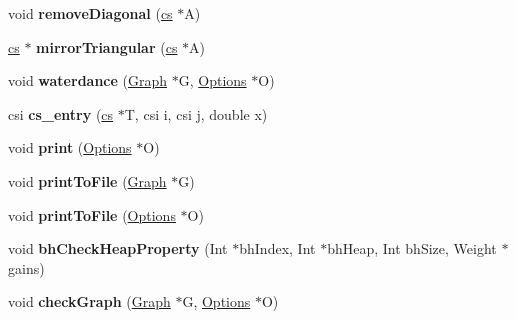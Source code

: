 \begin{DoxyCompactItemize}
\item 
\hypertarget{namespace_mongoose_aebb04732bf01ac108e1ca9cb71ffb901}{}\label{namespace_mongoose_aebb04732bf01ac108e1ca9cb71ffb901} 
void {\bfseries remove\+Diagonal} (\hyperlink{struct_mongoose_1_1cs__sparse}{cs} $\ast$A)
\item 
\hypertarget{namespace_mongoose_aacd398c03bd19cc028404da54e7b865a}{}\label{namespace_mongoose_aacd398c03bd19cc028404da54e7b865a} 
\hyperlink{struct_mongoose_1_1cs__sparse}{cs} $\ast$ {\bfseries mirror\+Triangular} (\hyperlink{struct_mongoose_1_1cs__sparse}{cs} $\ast$A)
\item 
\hypertarget{namespace_mongoose_a73887a05e38bb29fcc0f509ac026bad5}{}\label{namespace_mongoose_a73887a05e38bb29fcc0f509ac026bad5} 
void {\bfseries waterdance} (\hyperlink{class_mongoose_1_1_graph}{Graph} $\ast$G, \hyperlink{struct_mongoose_1_1_options}{Options} $\ast$O)
\item 
\hypertarget{namespace_mongoose_a08c783801d3076b6cfb4527865b30576}{}\label{namespace_mongoose_a08c783801d3076b6cfb4527865b30576} 
csi {\bfseries cs\+\_\+entry} (\hyperlink{struct_mongoose_1_1cs__sparse}{cs} $\ast$T, csi i, csi j, double x)
\item 
\hypertarget{namespace_mongoose_ad923c4193f9dd253f70b113a37a1d46f}{}\label{namespace_mongoose_ad923c4193f9dd253f70b113a37a1d46f} 
void {\bfseries print} (\hyperlink{struct_mongoose_1_1_options}{Options} $\ast$O)
\item 
\hypertarget{namespace_mongoose_afc0be98e4aad95e966f22abca8278011}{}\label{namespace_mongoose_afc0be98e4aad95e966f22abca8278011} 
void {\bfseries print\+To\+File} (\hyperlink{class_mongoose_1_1_graph}{Graph} $\ast$G)
\item 
\hypertarget{namespace_mongoose_a37874958f524a8531dc9ab1380333d51}{}\label{namespace_mongoose_a37874958f524a8531dc9ab1380333d51} 
void {\bfseries print\+To\+File} (\hyperlink{struct_mongoose_1_1_options}{Options} $\ast$O)
\item 
\hypertarget{namespace_mongoose_ad31e0452c9750b5c47e8bd1582273229}{}\label{namespace_mongoose_ad31e0452c9750b5c47e8bd1582273229} 
void {\bfseries bh\+Check\+Heap\+Property} (Int $\ast$bh\+Index, Int $\ast$bh\+Heap, Int bh\+Size, Weight $\ast$gains)
\item 
\hypertarget{namespace_mongoose_af2a7b02a45f2c9330e1281d6f1fd9f15}{}\label{namespace_mongoose_af2a7b02a45f2c9330e1281d6f1fd9f15} 
void {\bfseries check\+Graph} (\hyperlink{class_mongoose_1_1_graph}{Graph} $\ast$G, \hyperlink{struct_mongoose_1_1_options}{Options} $\ast$O)
\item 

\end{DoxyCompactItemize}
